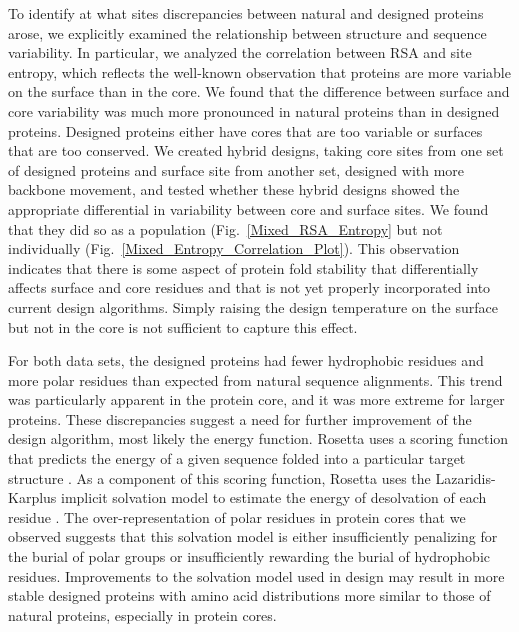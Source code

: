 \documentclass[12pt]{article}
\begin{document}
To identify at what sites discrepancies between natural and designed proteins arose, we explicitly examined the relationship between structure and sequence variability. In particular, we analyzed the correlation between RSA and site entropy, which reflects the well-known observation that proteins are more variable on the surface than in the core. We found that the difference between surface and core variability was much more pronounced in natural proteins than in designed proteins. Designed proteins either have cores that are too variable or surfaces that are too conserved. We created hybrid designs, taking core sites from one set of designed proteins and surface site from another set, designed with more backbone movement, and tested whether these hybrid designs showed the appropriate differential in variability between core and surface sites. We found that they did so as a population (Fig.~\ref{Mixed_RSA_Entropy} but not individually (Fig.~\ref{Mixed_Entropy_Correlation_Plot}). This observation indicates that there is some aspect of protein fold stability that differentially affects surface and core residues and that is not yet properly incorporated into current design algorithms. Simply raising the design temperature on the surface but not in the core is not sufficient to capture this effect.

For both data sets, the designed proteins had fewer hydrophobic residues and more polar residues than expected from natural sequence alignments. This trend was particularly apparent in the protein core, and it was more extreme for larger proteins. These discrepancies suggest a need for further improvement of the design algorithm, most likely the energy function. Rosetta uses a scoring function that predicts the energy of a given sequence folded into a particular target structure \citep{Kuhlman2003}. As a component of this scoring function, Rosetta uses the Lazaridis-Karplus implicit solvation model to estimate the energy of desolvation of each residue \citep{Lazaridis1999}. The over-representation of polar residues in protein cores that we observed suggests that this solvation model is either insufficiently penalizing for the burial of polar groups or insufficiently rewarding the burial of hydrophobic residues. Improvements to the solvation model used in design may result in more stable designed proteins with amino acid distributions more similar to those of natural proteins, especially in protein cores.
\end{document}
